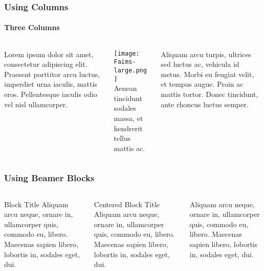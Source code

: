 \documentclass[
	aspectratio=169, %
	12pt, %
	t, %
]{beamer}
\begin{document}

\begin{frame}
	\frametitle{Using Columns}
	\framesubtitle{Three Columns}

	\begin{columns}[T]
		\begin{column}{0.3\textwidth}
			Lorem ipsum dolor sit amet, consectetur adipiscing elit. Praesent porttitor arcu luctus, imperdiet urna iaculis, mattis eros. Pellentesque iaculis odio vel nisl ullamcorper.
		\end{column}

		\begin{column}{0.3\textwidth}
			\texttt{[image: Faims-large.png]}\\[6pt]
			Aenean tincidunt sodales massa, et hendrerit tellus mattis ac.
		\end{column}
		
		\begin{column}{0.3\textwidth}
			Aliquam arcu turpis, ultrices sed luctus ac, vehicula id metus. Morbi eu feugiat velit, et tempus augue. Proin ac mattis tortor. Donec tincidunt, ante rhoncus luctus semper.
		\end{column}
	\end{columns}
\end{frame}


\begin{frame}
	\frametitle{Using Beamer Blocks}

	\begin{columns}[T]
		\begin{column}{0.3\textwidth}
			\begin{block}{Block Title}
				Aliquam arcu neque, ornare in, ullamcorper quis, commodo eu, libero. Maecenas sapien libero, lobortis in, sodales eget, dui.
			\end{block}
		\end{column}

		\begin{column}{0.3\textwidth}
			\begin{block}{\centering Centered Block Title}
				Aliquam arcu neque, ornare in, ullamcorper quis, commodo eu, libero. Maecenas sapien libero, lobortis in, sodales eget, dui.
			\end{block}
		\end{column}

		\begin{column}{0.3\textwidth}
			\begin{block}{\vspace{-\baselineskip}}
				Aliquam arcu neque, ornare in, ullamcorper quis, commodo eu, libero. Maecenas sapien libero, lobortis in, sodales eget, dui.
			\end{block}
		\end{column}
	\end{columns}
\end{frame}
\end{document}
